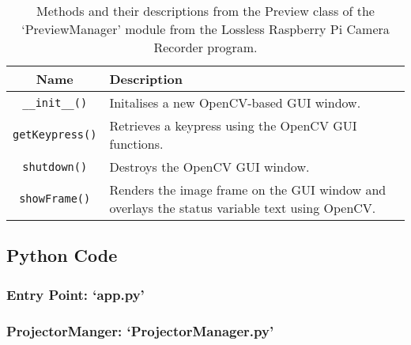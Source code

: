 \begin{table}[H]
    \centering
    \begin{tabularx}{\linewidth}{c | X}
        Name    &   Description\\
        \hline
        \hline
        \texttt{\_\_init\_\_()}     &   Initalises a new OpenCV-based GUI window.\\
        \hline
        \texttt{getKeypress()}     &   Retrieves a keypress using the OpenCV GUI functions.\\
        \hline
        \texttt{shutdown()}     &   Destroys the OpenCV GUI window.\\
        \hline
        \texttt{showFrame()}     &   Renders the image frame on the GUI window and overlays the status variable text using OpenCV.\\
        \hline
    \end{tabularx}
    \caption{Methods and their descriptions from the Preview class of the `PreviewManager' module from the Lossless Raspberry Pi Camera Recorder program.}
    \label{table:previewmanagerclassfuncs}
\end{table}


\subsection{Python Code}
\label{rec_code}
\subsubsection{Entry Point: `app.py'}




\subsubsection{ProjectorManger: `ProjectorManager.py'}




